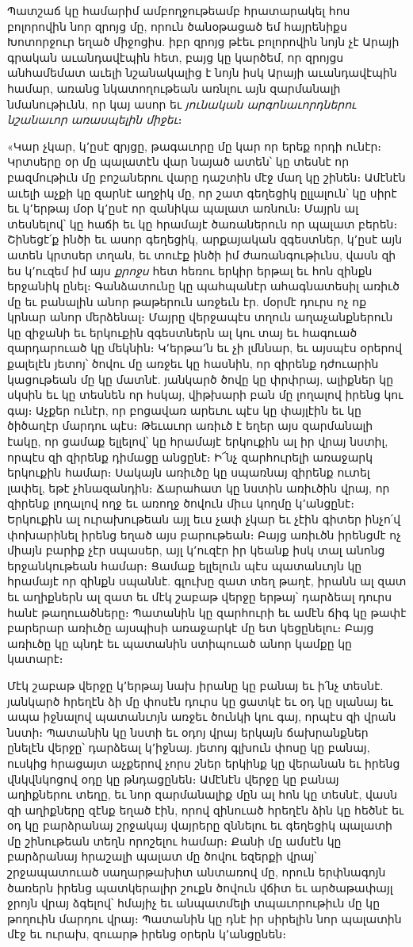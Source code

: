 \documentclass{article}
\begin{document}
{Պատշաճ կը համարիմ ամբողջութեամբ հրատարակել հոս բոլորովին նոր զրոյց մը, որուն ծանօթացած եմ հայրենիքս Խոտորջուր եղած միջոցիս. իբր զրոյց թէեւ բոլորովին նոյն չէ Արայի գրական աւանդավէպին հետ, բայց կը կարծեմ, որ զրոյցս անհամեմատ աւելի նշանակալից է նոյն իսկ Արայի աւանդավէպին համար, առանց նկատողութեան առնլու այն զարմանալի նմանութիւնն, որ կայ ասոր եւ \emph{յունական արգոնաւորդներու նշանաւոր առասպելին միջեւ}։

«Կար չկար, կ՚ըսէ զրյցը, թագաւորը մը կար որ երեք որդի ունէր։ Կրտսերը օր մը պալատէն վար նայած ատեն՝ կը տեսնէ որ բազմութիւն մը բոշաներու վարը դաշտին մէջ մաղ կը շինեն։ Ամէնէն աւելի աչքի կը զարնէ աղջիկ մը, որ շատ գեղեցիկ ըլլալուն՝ կը սիրէ եւ կ՚երթայ մօր կ՚ըսէ որ զանիկա պալատ առնուն։ Մայրն ալ տեսնելով՝ կը հաճի եւ կը հրամայէ ծառաներուն որ պալատ բերեն։ Շինեցէ՛ք ինծի եւ ասոր գեղեցիկ, արքայական զգեստներ, կ՚ըսէ այն ատեն կրտսեր տղան, եւ տուէք ինծի իմ ժառանգութիւնս, վասն զի ես կ՚ուզեմ իմ այս \emph{քրոջս} հետ հեռու երկիր երթալ եւ հոն զինքն երջանիկ ընել։ Գանձատունը կը պահպանէր ահագնատեսիլ առիւծ մը եւ բանալին անոր թաթերուն առջեւն էր. մօրմէ դուրս ոչ ոք կրնար անոր մերձենալ։ Մայրը վերջապէս տղուն աղաչանքներուն կը զիջանի եւ երկուքին զգեստներն ալ կու տայ եւ հագուած զարդարուած կը մեկնին։ Կ՚երթա՚ն եւ չի լմննար, եւ այսպէս օրերով քալելէն յետոյ՝ ծովու մը առջեւ կը հասնին, որ զիրենք դժուարին կացութեան մը կը մատնէ. յանկարծ ծովը կը փրփրայ, ալիքներ կը սկսին եւ կը տեսնեն որ հսկայ, վիթխարի բան մը լողալով իրենց կու գայ։ Աչքեր ունէր, որ բոցավառ արեւու պէս կը փայլէին եւ կը ծիծաղէր մարդու պէս։ Թեւաւոր առիւծ է եղեր այս զարմանալի էակը, որ ցամաք ելլելով՝ կը հրամայէ երկուքին ալ իր վրայ նստիլ, որպէս զի զիրենք դիմացը անցընէ։ Ի՜նչ զարհուրելի առաջարկ երկուքին համար։ Սակայն առիւծը կը սպառնայ զիրենք ուտել լափել, եթէ չհնազանդին։ Ճարահատ կը նստին առիւծին վրայ, որ զիրենք լողալով ողջ եւ առողջ ծովուն միւս կողմը կ՚անցընէ։ Երկուքին ալ ուրախութեան այլ եւս չափ չկար եւ չէին գիտեր ինչո՛վ փոխարինել իրենց եղած այս բարութեան։ Բայց առիւծն իրենցմէ ոչ միայն բարիք չէր սպասեր, այլ կ՚ուզէր իր կեանք իսկ տալ անոնց երջանկութեան համար։ Ցամաք ելլելուն պէս պատանւոյն կը հրամայէ որ զինքն սպաննէ. գլուխը զատ տեղ թաղէ, իրանն ալ զատ եւ աղիքներն ալ զատ եւ մէկ շաբաթ վերջը երթայ՝ դարձեալ դուրս հանէ թաղուածները։ Պատանին կը զարհուրի եւ ամէն ճիգ կը թափէ բարերար առիւծը այսպիսի առաջարկէ մը ետ կեցընելու։ Բայց առիւծը կը պնդէ եւ պատանին ստիպուած անոր կամքը կը կատարէ։

Մէկ շաբաթ վերջը կ՚երթայ նախ իրանը կը բանայ եւ ի՛նչ տեսնէ. յանկարծ հրեղէն ձի մը փոսէն դուրս կը ցատկէ եւ օդ կը սլանայ եւ ապա իջնալով պատանւոյն առջեւ ծունկի կու գայ, որպէս զի վրան նստի։ Պատանին կը նստի եւ օդոյ վրայ երկայն ճախրանքներ ընելէն վերջը՝ դարձեալ կ՚իջնայ. յետոյ գլխուն փոսը կը բանայ, ուսկից հրացայտ աչքերով չորս շներ երկինք կը վերանան եւ իրենց վնկվնկոցով օդը կը թնդացընեն։ Ամէնէն վերջը կը բանայ աղիքներու տեղը, եւ նոր զարմանալիք մըն ալ հոն կը տեսնէ, վասն զի աղիքները զէնք եղած էին, որով զինուած հրեղէն ձին կը հեծնէ եւ օդ կը բարձրանայ շրջակայ վայրերը զննելու եւ գեղեցիկ պալատի մը շինութեան տեղն որոշելու համար։ Քանի մը ամսէն կը բարձրանայ հրաշալի պալատ մը ծովու եզերքի վրայ՝ շրջապատուած սաղարթախիտ անտառով մը, որուն երփնագոյն ծառերն իրենց պատկերալիր շուքն ծովուն վճիտ եւ արծաթափայլ ջրոյն վրայ ձգելով՝ հմայիչ եւ անպատմելի տպաւորութիւն մը կը թողուին մարդու վրայ։ Պատանին կը դնէ իր սիրելին նոր պալատին մէջ եւ ուրախ, զուարթ իրենց օրերն կ՚անցընեն։

}
\end{document}
